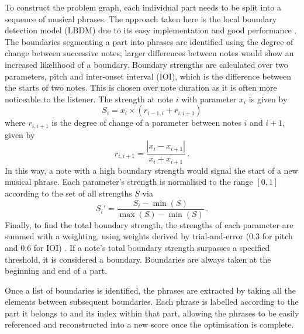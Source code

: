 \documentclass[aps,pra,10pt,twocolumn]{revtex4-2}
\begin{document}
To construct the problem graph, each individual part needs to be split into a sequence of musical phrases. The approach taken here is the local boundary detection model (LBDM) due to its easy implementation and good performance \cite{cambouropoulos_lbdm_2011}. The boundaries segmenting a part into phrases are identified using the degree of change between successive notes; larger differences between notes would show an increased likelihood of a boundary. Boundary strengths are calculated over two parameters, pitch and inter-onset interval (IOI), which is the difference between the starts of two notes. This is chosen over note duration as it is often more noticeable to the listener. The strength at note $i$ with parameter $x_i$ is given by
\begin{equation}
    S_i=x_i\times (r_{i-1, i} + r_{i, i+1})
    \label{eq:boundary-strength}
\end{equation}
where $r_{i, i+1}$ is the degree of change of a parameter between notes $i$ and $i+1$, given by
\begin{equation}
    r_{i, i+1}=\frac{|x_{i}-x_{i+1}|}{x_{i}+x_{i+1}} \,.
    \label{eq:degree-change}
\end{equation}
In this way, a note with a high boundary strength would signal the start of a new musical phrase. Each parameter's strength is normalised to the range $[0,1]$ according to the set of all strengths $S$ via
\begin{equation}
    S_i'=\frac{S_i-\min(S)}{\max(S)-\min(S)} \,.
    \label{eq:normalisation}
\end{equation}
Finally, to find the total boundary strength, the strengths of each parameter are summed with a weighting, using weights derived by trial-and-error ($0.3$ for pitch and $0.6$ for IOI) \cite{cambouropoulos_lbdm_2011}. If a note's total boundary strength surpasses a specified threshold, it is considered a boundary. Boundaries are always taken at the beginning and end of a part.

Once a list of boundaries is identified, the phrases are extracted by taking all the elements between subsequent boundaries. Each phrase is labelled according to the part it belongs to and its index within that part, allowing the phrases to be easily referenced and reconstructed into a new score once the optimisation is complete.
\end{document}
